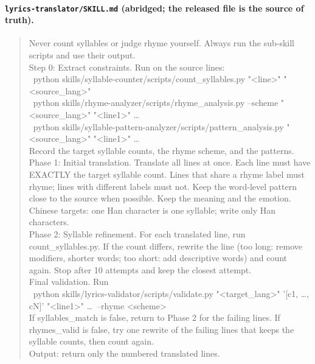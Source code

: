 \documentclass[11pt]{article}
\begin{document}
\paragraph{\texttt{lyrics-translator/SKILL.md} (abridged; the released file is the source of truth).}
\begin{quote}
\small\ttfamily\raggedright
Never count syllables or judge rhyme yourself. Always run the sub-skill scripts and use their output.\\[4pt]
Step 0: Extract constraints. Run on the source lines:\\
\ python skills/\allowbreak{}syllable-counter/\allowbreak{}scripts/\allowbreak{}count\_syllables.py "<line>" "<source\_lang>"\\
\ python skills/\allowbreak{}rhyme-analyzer/\allowbreak{}scripts/\allowbreak{}rhyme\_analysis.py --scheme "<source\_lang>" "<line1>" \ldots\\
\ python skills/\allowbreak{}syllable-pattern-analyzer/\allowbreak{}scripts/\allowbreak{}pattern\_analysis.py "<source\_lang>" "<line1>" \ldots\\
Record the target syllable counts, the rhyme scheme, and the patterns.\\[4pt]
Phase 1: Initial translation. Translate all lines at once. Each line must have EXACTLY the target syllable count. Lines that share a rhyme label must rhyme; lines with different labels must not. Keep the word-level pattern close to the source when possible. Keep the meaning and the emotion. Chinese targets: one Han character is one syllable; write only Han characters.\\[4pt]
Phase 2: Syllable refinement. For each translated line, run count\_syllables.py. If the count differs, rewrite the line (too long: remove modifiers, shorter words; too short: add descriptive words) and count again. Stop after 10 attempts and keep the closest attempt.\\[4pt]
Final validation. Run\\
\ python skills/\allowbreak{}lyrics-validator/\allowbreak{}scripts/\allowbreak{}validate.py "<target\_lang>" '[c1, \ldots, cN]' "<line1>" \ldots\ --rhyme <scheme>\\
If syllables\_match is false, return to Phase 2 for the failing lines. If rhymes\_valid is false, try one rewrite of the failing lines that keeps the syllable counts, then count again.\\[4pt]
Output: return only the numbered translated lines.
\end{quote}
\end{document}
